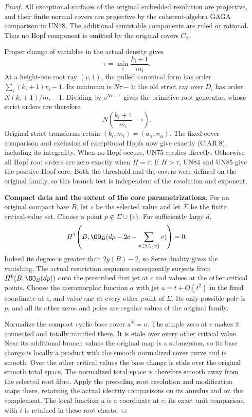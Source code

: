 \begin{proof}
All exceptional surfaces of the original
embedded resolution are projective, and
their finite normal covers are projective
by the coherent-algebra GAGA comparison
in UN78. The additional semistable
components are ruled or rational.
Thus no Hopf component is omitted by
the original covers \(C_\alpha\).

Proper change of variables in the actual
density gives
\[
                   \tau=\min_i\frac{k_i+1}{m_i}.
 \tag{C.AR.15}
\]
At a height-one root ray \((v,1)\),
the pulled canonical form has order
\(\sum_i(k_i+1)v_i-1\). Its minimum
is \(N\tau-1\); the old strict ray
over \(D_i\) has order
\(N(k_i+1)/m_i-1\). Dividing by
\(s^{N\tau-1}\) gives the primitive
root generator, whose strict orders
are therefore
\[
                  N\left(\frac{k_i+1}{m_i}-\tau\right).
 \tag{C.AR.16}
\]
Original strict transforms retain
\((k_i,m_i)=(a_\alpha,n_\alpha)\).
The fixed-cover comparison and exclusion
of exceptional Hopfs now give exactly
(C.AR.8), including its integrality.
When no Hopf occurs, UN75 applies
directly. Otherwise all Hopf root
orders are zero exactly when
\(H=\tau\). If \(H>\tau\), UN84
and UN85 give the positive-Hopf core.
Both the threshold and the covers
were defined on the original family,
so this branch test is independent
of the resolution and exponent.

\par\medskip\noindent\textbf{Compact data and the extent of the core parametrizations.}
For an original compact base \(B\), let
\(c\) be the selected value and let
\(\Sigma\) be the finite critical-value set.
Choose a point \(p\notin\Sigma\cup\{c\}\).
For sufficiently large \(d\),
\[
 H^1\!\left(B,\OO_B(dp-2c-
                    \sum_{v\in\Sigma\setminus\{c\}}v)\right)=0.
\]
Indeed its degree is greater than \(2g(B)-2\),
so Serre duality gives the vanishing. The
actual restriction sequence consequently
surjects from \(H^0(B,\OO_B(dp))\) onto
the prescribed first jet at \(c\) and
values at the other critical points.
Choose the meromorphic function \(a\)
with jet \(a=t+O(t^2)\) in the fixed
coordinate at \(c\), and value one at
every other point of \(\Sigma\).
Its only possible pole is \(p\), and
all its other zeros and poles are regular
values of the original family.

Normalize the compact cyclic base cover
\(s^N=a\). The simple zero at \(c\)
makes it connected and totally ramified
there. It is etale over every other
critical value. Near its additional
branch values the original map is a
submersion, so its base change is locally
a product with the smooth normalized
cover curve and is smooth. Over the
other critical values the base change
is etale over the original smooth total
space. The normalized total space is
therefore smooth away from the selected
root fibre. Apply the preceding root
resolution and modification maps there,
retaining the actual identity comparisons
on its annulus and on the complement.
The local function \(a\) is a coordinate
at \(c\); its exact unit comparison with
\(t\) is retained in these root charts.


\end{proof}
